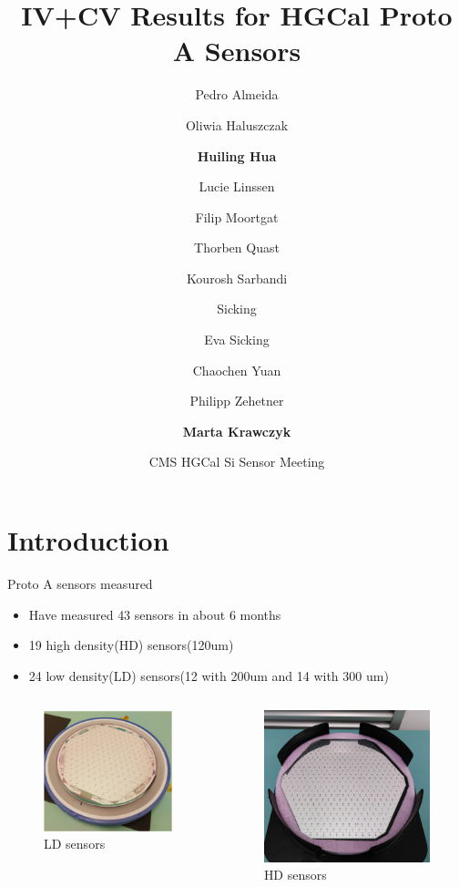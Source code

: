 \documentclass{beamer}
\title[huilng.hua@cern.ch] %
{IV+CV Results for HGCal Proto A Sensors}
\author[Huiling Hua] %
{ Pedro Almeida\and Oliwia Haluszczak\and \textbf{Huiling Hua} \and Lucie Linssen\and Filip Moortgat\and Thorben Quast\and Kourosh Sarbandi\and Sicking\and Eva Sicking\and
Chaochen Yuan\and Philipp Zehetner\and \textbf{Marta Krawczyk} }
\date[2022.02.10] %
{CMS HGCal Si Sensor Meeting}
\begin{document}
\begin{frame}
  \titlepage
\end{frame}

\section{Introduction}

\begin{frame}{Proto A sensors measured}
    \begin{itemize}
        \item Have measured \alert{43 sensors} in about \alert{6 months} 
        \item 19 high density(HD) sensors(120um) 
        \item 24 low density(LD) sensors(12 with 200um and 14 with 300 um)
    \end{itemize}

    \begin{columns}
        \begin{figure}
            \includegraphics[width=.6\textwidth]{plots/LDsensors.png}
            \caption{LD sensors}
        \end{figure}
        \begin{figure}
            \includegraphics[width=.6\textwidth]{plots/HDsensors.png}
            \caption{HD sensors}
        \end{figure}
    \end{columns}

\end{frame}
\end{document}
